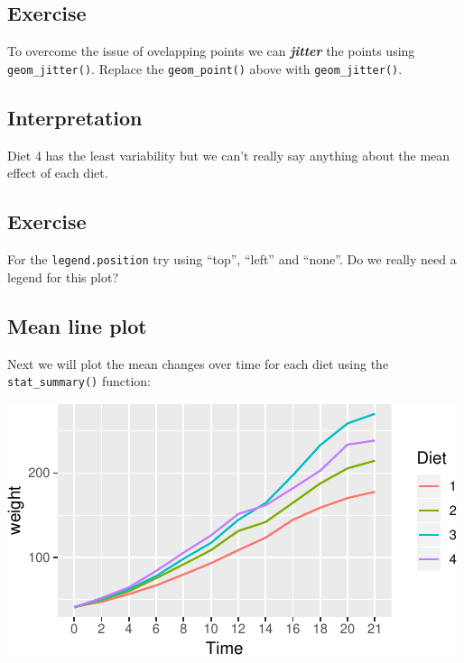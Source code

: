 \documentclass[a4paper,9pt,twocolumn,twoside,printwatermark=false]{pinp}
\begin{document}
\subsection{Exercise}\label{exercise-4}

To overcome the issue of ovelapping points we can \textbf{\emph{jitter}}
the points using \texttt{geom\_jitter()}. Replace the
\texttt{geom\_point()} above with \texttt{geom\_jitter()}.

\subsection{Interpretation}\label{interpretation-2}

Diet 4 has the least variability but we can't really say anything about
the mean effect of each diet.

\subsection{Exercise}\label{exercise-5}

For the \texttt{legend.position} try using ``top'', ``left'' and
``none''. Do we really need a legend for this plot?

\subsection{Mean line plot}\label{mean-line-plot}

Next we will plot the mean changes over time for each diet using the
\texttt{stat\_summary()} function:

\begin{Shaded}
\begin{Highlighting}[]
               \OperatorTok{+}
\StringTok{  }\NormalTok{(}\NormalTok{, }\NormalTok{) }
\end{Highlighting}
\end{Shaded}

\begin{center}\includegraphics{Getting-Started-in-R_files/figure-latex/meanlinesPlot-1} \end{center}
\end{document}
